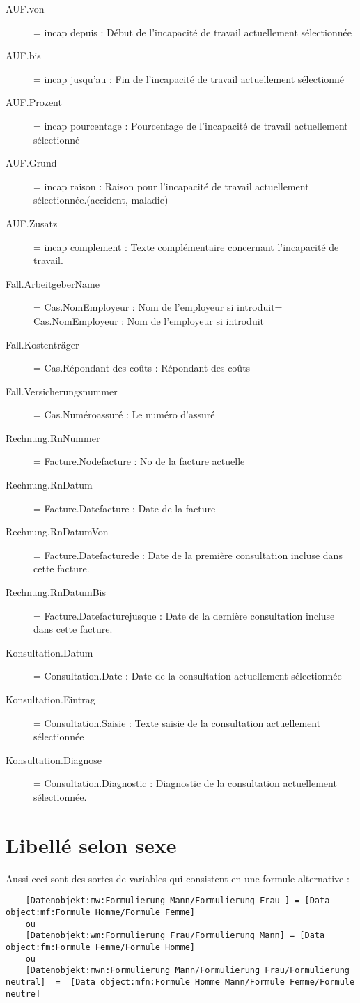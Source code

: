 \begin{description}
  \item [AUF.von] = incap depuis : Début de l'incapacité de travail actuellement sélectionnée
  \item [AUF.bis] = incap jusqu'au : Fin de l'incapacité de travail actuellement sélectionné
  \item [AUF.Prozent]= incap pourcentage : Pourcentage de l'incapacité de travail actuellement sélectionné 
  \item [AUF.Grund] = incap raison : Raison pour l'incapacité de travail actuellement sélectionnée.(accident, maladie) 
  \item [AUF.Zusatz] = incap complement : Texte complémentaire concernant l'incapacité de travail.
  \item [Fall.ArbeitgeberName] = Cas.NomEmployeur : Nom de l'employeur si introduit= Cas.NomEmployeur : Nom de l'employeur si introduit
  \item [Fall.Kostenträger] = Cas.Répondant des coûts : Répondant des coûts
  \item [Fall.Versicherungsnummer] = Cas.Numéroassuré : Le numéro d'assuré 
  \item [Rechnung.RnNummer] = Facture.Nodefacture : No de la facture actuelle
  \item [Rechnung.RnDatum] = Facture.Datefacture : Date de la facture
  \item [Rechnung.RnDatumVon] = Facture.Datefacturede : Date de la première consultation incluse dans cette facture.
  \item [Rechnung.RnDatumBis]= Facture.Datefacturejusque : Date de la dernière consultation incluse dans cette facture.
  \item [Konsultation.Datum] = Consultation.Date : Date de la consultation actuellement sélectionnée
  \item [Konsultation.Eintrag] = Consultation.Saisie : Texte saisie de la consultation actuellement sélectionnée
  \item [Konsultation.Diagnose] = Consultation.Diagnostic : Diagnostic de la consultation actuellement sélectionnée.

\end{description}

\section{Libellé selon sexe}
Aussi ceci sont des sortes de variables qui consistent en une formule alternative :

\begin{verbatim}
    [Datenobjekt:mw:Formulierung Mann/Formulierung Frau ] = [Data object:mf:Formule Homme/Formule Femme]
    ou
    [Datenobjekt:wm:Formulierung Frau/Formulierung Mann] = [Data object:fm:Formule Femme/Formule Homme]
    ou
    [Datenobjekt:mwn:Formulierung Mann/Formulierung Frau/Formulierung neutral]  =  [Data object:mfn:Formule Homme Mann/Formule Femme/Formule neutre]
\end{verbatim}

